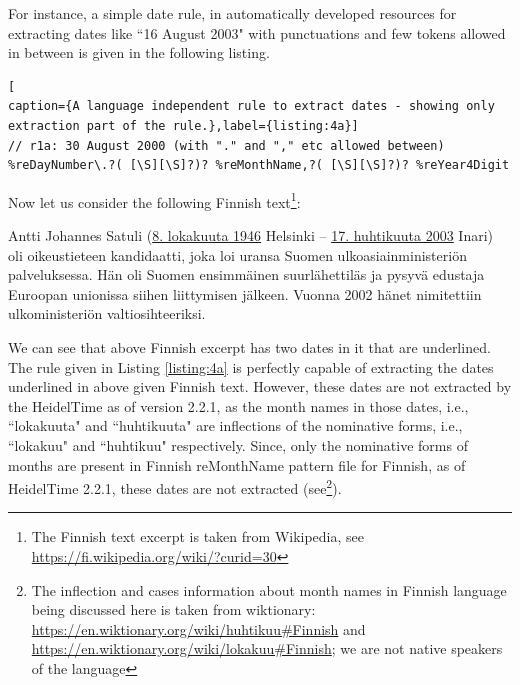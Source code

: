 For instance, a simple date rule, in automatically developed resources for extracting dates like ``16 August 2003" with punctuations and few tokens allowed in between is given in the following listing. \\


\begin{minipage}{\linewidth}
\begin{lstlisting}[
caption={A language independent rule to extract dates - showing only extraction part of the rule.},label={listing:4a}]
// r1a: 30 August 2000 (with "." and "," etc allowed between)
%reDayNumber\.?( [\S][\S]?)? %reMonthName,?( [\S][\S]?)? %reYear4Digit
\end{lstlisting}
\end{minipage}


Now let us consider the following Finnish text\footnote{The Finnish text excerpt is taken from Wikipedia, see \url{https://fi.wikipedia.org/wiki/?curid=30}}:

	\begin{mdframed}[style=MyFrame]
		\raggedright{
			Antti Johannes Satuli (\ul{8. lokakuuta 1946} Helsinki – \ul{17. huhtikuuta 2003} Inari) oli oikeustieteen kandidaatti, joka loi uransa Suomen ulkoasiainministeriön palveluksessa. Hän oli Suomen ensimmäinen suurlähettiläs ja pysyvä edustaja Euroopan unionissa siihen liittymisen jälkeen. Vuonna 2002 hänet nimitettiin ulkoministeriön valtiosihteeriksi.
		}
	\end{mdframed}

We can see that above Finnish excerpt has two dates in it that are underlined. The rule given in Listing \ref{listing:4a} is perfectly capable of extracting the dates underlined in above given Finnish text. However, these dates are not extracted by the HeidelTime as of version 2.2.1, as the month names in those dates, i.e., ``lokakuuta" and ``huhtikuuta" are inflections of the nominative forms, i.e., ``lokakuu" and ``huhtikuu" respectively. Since, only the nominative forms of months are present in Finnish reMonthName pattern file for Finnish, as of HeidelTime 2.2.1, these dates are not extracted (see\footnote{The inflection and cases information about month names in Finnish language being discussed here is taken from wiktionary: \url{https://en.wiktionary.org/wiki/huhtikuu\#Finnish} and \url{https://en.wiktionary.org/wiki/lokakuu\#Finnish}; we are not native speakers of the language}). 

